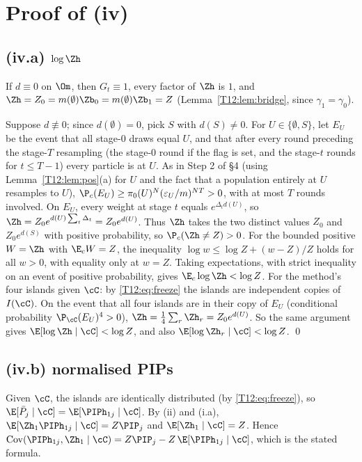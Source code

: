 \documentclass[11pt]{report}
\begin{document}
\section{Proof of (iv)}

\subsection{(iv.a) $\log\Zh$}
If $d\equiv0$ on $\Om$, then $G_t\equiv1$, every factor of $\Zh$ is $1$, and $\Zh=Z_0=m(\emptyset)\Zb_0=m(\emptyset)\Zb_1=Z$ (Lemma~\ref{T12:lem:bridge}, since $\gamma_1=\gamma_0$).

Suppose $d\not\equiv0$; since $d(\emptyset)=0$, pick $S$ with $d(S)\ne0$. For $U\in\{\emptyset,S\}$, let $E_U$ be the event that all stage-0 draws equal $U$, and that after every round preceding the stage-$T$ resampling (the stage-0 round if the flag is set, and the stage-$t$ rounds for $t\le T-1$) every particle is at $U$. As in Step 2 of \S4 (using Lemma~\ref{T12:lem:pos}(a) for $U$ and the fact that a population entirely at $U$ resamples to $U$), $\P_c(E_U)\ge \pi_0(U)^N(\varepsilon_U/m)^{NT}>0$, with at most $T$ rounds involved. On $E_U$, every weight at stage $t$ equals $e^{\Delta_td(U)}$, so $\Zh=Z_0e^{d(U)\sum_t\Delta_t}=Z_0e^{d(U)}$. Thus $\Zh$ takes the two distinct values $Z_0$ and $Z_0e^{d(S)}$ with positive probability, so $\P_c(\Zh\ne Z)>0$. For the bounded positive $W=\Zh$ with $\E_cW=Z$, the inequality $\log w\le\log Z+(w-Z)/Z$ holds for all $w>0$, with equality only at $w=Z$. Taking expectations, with strict inequality on an event of positive probability, gives $\E_c\log\Zh<\log Z$. For the method's four islands given $\cC$: by \eqref{T12:eq:freeze} the islands are independent copies of $I(\cC)$. On the event that all four islands are in their copy of $E_U$ (conditional probability $\P_\cC(E_U)^4>0$), $\Zh=\frac14\sum_r\Zh_r=Z_0e^{d(U)}$. So the same argument gives $\E[\log\Zh\mid\cC]<\log Z$, and also $\E[\log\Zh_r\mid\cC]<\log Z$. \qed

\subsection{(iv.b) normalised PIPs}
Given $\cC$, the islands are identically distributed (by \eqref{T12:eq:freeze}), so $\E[\bar P_j\mid\cC]=\E[\PIPh_{1j}\mid\cC]$. By (ii) and (i.a), $\E[\Zh_1\PIPh_{1j}\mid\cC]=Z\PIP_j$ and $\E[\Zh_1\mid\cC]=Z$. Hence
$\mathrm{Cov}(\PIPh_{1j},\Zh_1\mid\cC)=Z\PIP_j-Z\,\E[\PIPh_{1j}\mid\cC]$, which is the stated formula.
\end{document}
